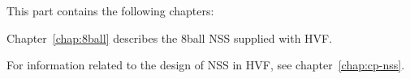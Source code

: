 \label{ch:supplied-nss}
\cbstart
This part contains the following chapters:

Chapter~\ref{chap:8ball} describes the 8ball NSS supplied with HVF.

For information related to the design of NSS in HVF, see
chapter~\ref{chap:cp-nss}.


\cbend
